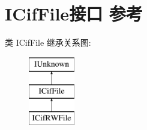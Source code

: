 \hypertarget{interface_i_cif_file}{}\section{I\+Cif\+File接口 参考}
\label{interface_i_cif_file}
类 I\+Cif\+File 继承关系图\+:\begin{figure}[H]
\begin{center}
\leavevmode
\includegraphics[height=3.000000cm]{interface_i_cif_file}
\end{center}
\end{figure}
